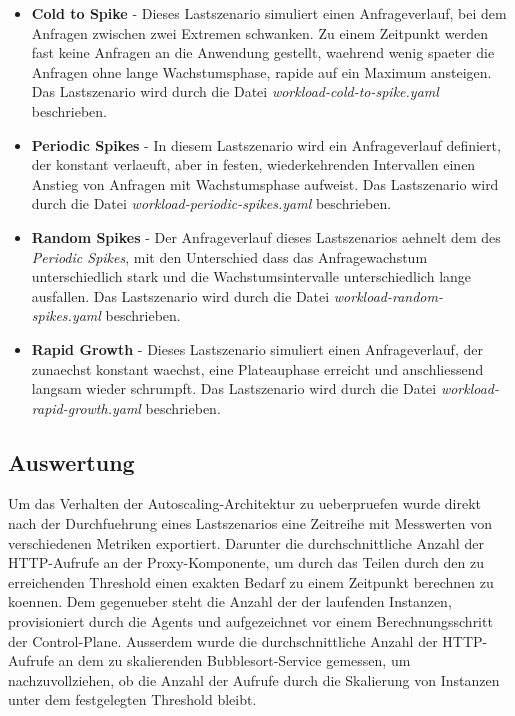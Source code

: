 \documentclass[runningheads]{llncs}
\begin{document}
 \begin{itemize}
 	\item \textbf{Cold to Spike} - Dieses Lastszenario simuliert einen Anfrageverlauf, bei dem Anfragen zwischen zwei Extremen schwanken. Zu einem Zeitpunkt werden fast keine Anfragen an die Anwendung gestellt, waehrend wenig spaeter die Anfragen ohne lange Wachstumsphase, rapide auf ein Maximum ansteigen. Das Lastszenario wird durch die Datei \textit{workload-cold-to-spike.yaml} beschrieben.
 	
 	\item \textbf{Periodic Spikes} - In diesem Lastszenario wird ein Anfrageverlauf definiert, der konstant verlaeuft, aber in festen, wiederkehrenden Intervallen einen Anstieg von Anfragen mit Wachstumsphase aufweist.  Das Lastszenario wird durch die Datei \textit{workload-periodic-spikes.yaml} beschrieben.
 	
 	\item \textbf{Random Spikes} - Der Anfrageverlauf dieses Lastszenarios aehnelt dem des \textit{Periodic Spikes}, mit den Unterschied dass das Anfragewachstum unterschiedlich stark und die Wachstumsintervalle unterschiedlich lange ausfallen.  Das Lastszenario wird durch die Datei \textit{workload-random-spikes.yaml} beschrieben.
 	
 	\item \textbf{Rapid Growth} -  Dieses Lastszenario simuliert einen Anfrageverlauf, der zunaechst konstant waechst, eine Plateauphase erreicht und anschliessend langsam wieder schrumpft. Das Lastszenario wird durch die Datei \textit{workload-rapid-growth.yaml} beschrieben.
 \end{itemize}

\subsection{Auswertung}

Um das Verhalten der Autoscaling-Architektur zu ueberpruefen wurde direkt nach der Durchfuehrung eines Lastszenarios eine Zeitreihe mit Messwerten von verschiedenen Metriken exportiert. Darunter die durchschnittliche Anzahl der HTTP-Aufrufe an der Proxy-Komponente, um durch das Teilen durch den zu erreichenden Threshold einen exakten Bedarf zu einem Zeitpunkt berechnen zu koennen. Dem gegenueber steht die Anzahl der der laufenden Instanzen, provisioniert durch die Agents und aufgezeichnet vor einem Berechnungsschritt der Control-Plane. Ausserdem wurde die durchschnittliche Anzahl der HTTP-Aufrufe an dem zu skalierenden Bubblesort-Service gemessen, um nachzuvollziehen, ob die Anzahl der Aufrufe durch die Skalierung von Instanzen unter dem festgelegten Threshold bleibt.
\end{document}

